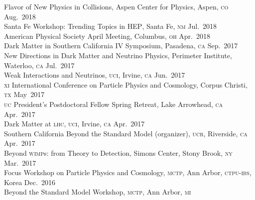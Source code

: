 \documentclass[margin,line]{resume}
\newcommand{\scap}[1]{\textsc{\MakeLowercase{#1}}}
\begin{document}
\begin{resume}
Flavor of New Physics in Collisions, 
Aspen Center for Physics, Aspen, \scap{CO}
\hfill Aug.~2018\vspace{.7mm}\\   
%
Santa Fe Workshop: Trending Topics in \textsc{HEP}, Santa Fe, \scap{NM}
\hfill Jul.~2018\vspace{.7mm}\\   
%   
American Physical Society April Meeting, Columbus, \scap{OH}
\hfill Apr.~2018\vspace{.7mm}\\   
%   
Dark Matter in Southern California IV Symposium, Pasadena, \scap{CA}
\hfill Sep.~2017\vspace{.7mm}\\   
%   
New Directions in Dark Matter and Neutrino Physics, Perimeter Institute, Waterloo, \scap{CA}
\hfill %
Jul.~2017\vspace{.7mm}\\   
%
Weak Interactions and Neutrinos, \scap{UCI}, Irvine, \scap{CA}
\hfill Jun.~2017\vspace{.7mm}\\   
%
\scap{XI} International Conference on Particle Physics and Cosmology, Corpus Christi, \scap{TX}
\hfill May~2017\vspace{.7mm}\\   
%
\scap{UC} President's Postdoctoral Fellow Spring Retreat, Lake Arrowhead, \scap{CA}
\hfill Apr.~2017\vspace{.7mm}\\   
%
Dark Matter at \scap{LHC}, \scap{UCI}, Irvine, \scap{CA}
\hfill Apr.~2017\vspace{.7mm}\\   
%
Southern California Beyond the Standard Model (organizer), \scap{UCR}, Riverside, \scap{CA}
\hfill Apr.~2017\vspace{.7mm}\\   
%
Beyond \scap{WIMP}s: from Theory to Detection, Simons Center, Stony Brook, \scap{NY}
\hfill Mar.~2017\vspace{.7mm}\\   
%
Focus Workshop on Particle Physics and Cosmology, \scap{MCTP}, Ann Arbor, \scap{CTPU-IBS}, Korea
\hfill Dec.~2016\vspace{.7mm}\\   
%
Beyond the Standard Model Workshop, \scap{MCTP}, Ann Arbor, \scap{MI}

\end{resume}
\end{document}
